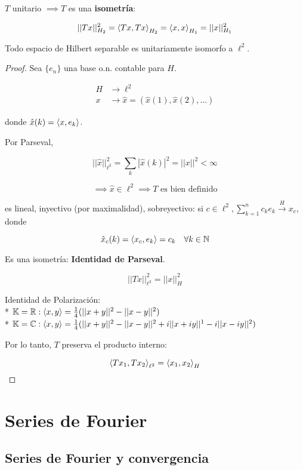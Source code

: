 $T$ unitario $\implies T$ es una \textbf{isometría}:

\[||Tx||_{H_2}^2=\left\langle Tx,Tx\right\rangle_{H_2}=\left\langle x,x\right\rangle_{H_1}=||x||_{H_1}^2\]

\begin{ftheorem}
    Todo espacio de Hilbert separable es unitariamente isomorfo a $\ell^2$.
\end{ftheorem}

\begin{proof}
    Sea $\{e_n\}$ una base o.n. contable para $H$.

    \begin{align*}
        H&\to \ell^2\\
        x&\to \hat x=(\hat x(1),\hat x(2),\ldots)
    \end{align*}

    donde $\hat x(k)=\left\langle x,e_k\right\rangle$.

    Por Parseval,

    \[||\hat x||_{\ell^2}^2=\sum_{k}|\hat x(k)|^2=||x||^2<\infty\]

    \[\implies \hat x\in \ell^2\implies T\text{ es bien definido}\]

    es lineal, inyectivo (por maximalidad), sobreyectivo: si $c\in\ell^2, \sum_{k=1}^n c_k e_k\xrightarrow{H} x_c$, donde 

    \[\hat x_c(k)=\left\langle x_c,e_k\right\rangle=c_k\quad\forall k\in\mathbb{N}\]

    Es una isometría: \textbf{Identidad de Parseval}.

    \[||Tx||_{\ell^2}^2=||x||_H^2\]

    Identidad de Polarización:\\*
    $\mathbb{K}=\mathbb{R}:\left\langle x,y\right\rangle=\frac{1}{4}(||x+y||^2-||x-y||^2)$\\*
    $\mathbb{K}=\mathbb{C}:\left\langle x,y\right\rangle=\frac{1}{4}(||x+y||^2-||x-y||^2+i||x+iy||^1-i||x-iy||^2)$

    Por lo tanto, $T$ preserva el producto interno:

    \[\left\langle Tx_1,Tx_2\right\rangle_{\ell^2}=\left\langle x_1,x_2\right\rangle_H\]
\end{proof}

\section{Series de Fourier}

\subsection{Series de Fourier y convergencia}

